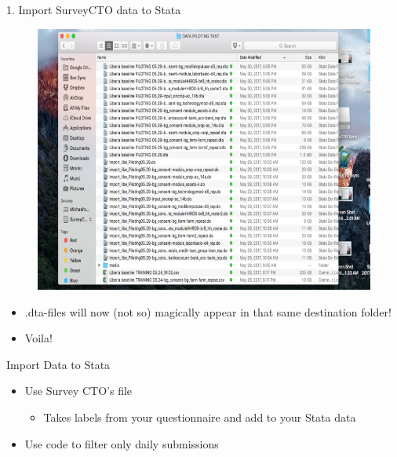 \documentclass[aspectratio=169]{beamer}
\begin{document}
\begin{frame}[fragile]{1. Import SurveyCTO data to Stata}
\begin{multicols}{2}	
	\begin{figure}
		\centering
		\includegraphics[width=\linewidth]{img/stata_dta2}
	\end{figure}
	\begin{itemize}
		\item .dta-files will now (not so) magically appear in that same destination folder!
		\item Voila!	 
	\end{itemize}
\end{multicols}
\end{frame}


\begin{frame}{Import Data to Stata}
\begin{itemize}
	\item Use Survey CTO’s file
		\begin{itemize}
			\item Takes labels from your questionnaire and add to your Stata data
		\end{itemize}
	\item Use code to filter only daily submissions
		\end{itemize}
\end{frame}
\end{document}
